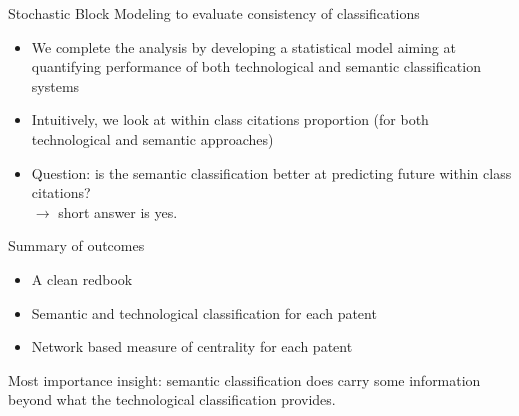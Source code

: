\documentclass{beamer}
\begin{document}
\begin{frame}{Stochastic Block Modeling to evaluate consistency of classifications}
\begin{itemize}
    \item   We complete the analysis by developing a statistical model aiming at quantifying performance of both technological and semantic classification systems
    \item Intuitively, we look at within class citations proportion (for both technological and semantic approaches)
    \item Question: is the semantic classification better at predicting future within class citations? \\
    $\longrightarrow$ short answer is \alert{yes}.
\end{itemize} 
\end{frame}

\begin{frame}{Summary of outcomes}
    \begin{itemize}
        \item A clean redbook
        \item Semantic and technological classification for each patent
        \item Network based measure of centrality for each patent
    \end{itemize}
    
    Most importance insight: semantic classification does carry some information beyond what the technological classification provides.
\end{frame}
\end{document}
